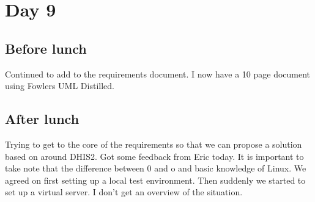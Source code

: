 \section{Day 9}
\subsection{Before lunch}
Continued to add to the requirements document.
I now have a 10 page document using Fowlers UML Distilled.

\subsection{After lunch}
Trying to get to the core of the requirements so that we can propose a solution based on around DHIS2.
Got some feedback from Eric today.
It is important to take note that the difference between 0 and o and basic knowledge of Linux.
We agreed on first setting up a local test environment. Then suddenly we started to set up a virtual server. I don't get an overview of the situation.